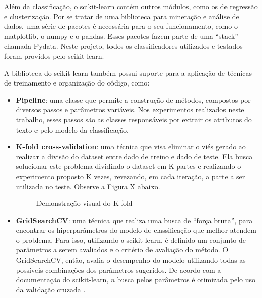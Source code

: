 Além da classificação, o scikit-learn contém outros módulos, como os de regressão e clusterização. Por se tratar de uma biblioteca para mineração e análise de dados, uma série de pacotes é necessária para o seu funcionamento, como o matplotlib, o numpy e o pandas. Esses pacotes fazem parte de uma “stack” chamada Pydata. Neste projeto, todos os classificadores utilizados e testados foram providos pelo scikit-learn.

A biblioteca do scikit-learn também possui suporte para a aplicação de técnicas de treinamento e organização do código, como:

\begin{itemize}
    \item \textbf{Pipeline}: uma classe que permite a construção de métodos, compostos por diversos passos e parâmetros variáveis. Nos experimentos realizados neste trabalho, esses passos são as classes responsáveis por extrair os atributos do texto e pelo modelo da classificação.
    \item \textbf{K-fold cross-validation}: uma técnica que visa eliminar o viés gerado ao realizar a divisão do dataset entre dado de treino e dado de teste. Ela busca solucionar este problema dividindo o dataset em K partes e realizando o experimento proposto K vezes, revezando, em cada iteração, a parte a ser utilizada no teste. Observe a Figura X abaixo.
    
    \begin{figure}[!htb]
        \caption{\label{fig:my-label} Demonstração visual do K-fold}
    \end{figure}
    
   \item \textbf{GridSearchCV}: uma técnica que realiza uma busca de “força bruta”, para encontrar os hiperparâmetros do modelo de classificação que melhor atendem o problema. Para isso, utilizando o scikit-learn, é definido um conjunto de parâmetros a serem avaliados e o critério de avaliação do método. O GridSearchCV, então, avalia o desempenho do modelo utilizando todas as possíveis combinações dos parâmetros sugeridos. De acordo com a documentação do scikit-learn, a busca pelos parâmetros é otimizada pelo uso da validação cruzada \cite{scikit-learn}.
\end{itemize}

